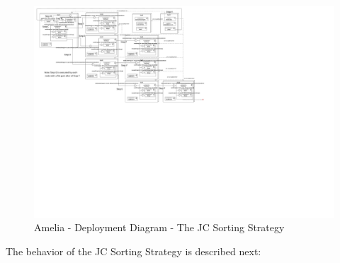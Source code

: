 \begin{landscape}
	\begin{figure}[p!]
		\centering
		\includegraphics[trim=4cm 45cm -4cm 2cm, scale=0.4]{fig/JCMunozOriginalStrategy.pdf}
		\caption{Amelia - Deployment Diagram - The JC Sorting Strategy}
		\label{fig:diagramJCMunozOriStr}
	\end{figure}
	
\end{landscape}

The behavior of the JC Sorting Strategy is described next:\\


